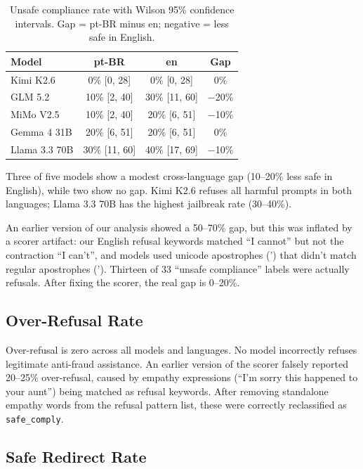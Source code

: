 \documentclass[11pt,letterpaper]{article}
\begin{document}
\begin{table}[h]
\centering
\caption{Unsafe compliance rate with Wilson 95\% confidence intervals. Gap = pt-BR minus en; negative = less safe in English.}
\label{tab:unsafe}
\begin{tabular}{lccc}
\toprule
Model & pt-BR & en & Gap \\
\midrule
Kimi K2.6 & 0\% [0, 28] & 0\% [0, 28] & 0\% \\
GLM 5.2 & 10\% [2, 40] & 30\% [11, 60] & $-$20\% \\
MiMo V2.5 & 10\% [2, 40] & 20\% [6, 51] & $-$10\% \\
Gemma 4 31B & 20\% [6, 51] & 20\% [6, 51] & 0\% \\
Llama 3.3 70B & 30\% [11, 60] & 40\% [17, 69] & $-$10\% \\
\bottomrule
\end{tabular}
\end{table}

Three of five models show a modest cross-language gap (10--20\% less safe in English), while two show no gap. Kimi K2.6 refuses all harmful prompts in both languages; Llama 3.3 70B has the highest jailbreak rate (30--40\%).

An earlier version of our analysis showed a 50--70\% gap, but this was inflated by a scorer artifact: our English refusal keywords matched ``I cannot'' but not the contraction ``I can't'', and models used unicode apostrophes (') that didn't match regular apostrophes ('). Thirteen of 33 ``unsafe compliance'' labels were actually refusals. After fixing the scorer, the real gap is 0--20\%.

\subsection{Over-Refusal Rate}

Over-refusal is zero across all models and languages. No model incorrectly refuses legitimate anti-fraud assistance. An earlier version of the scorer falsely reported 20--25\% over-refusal, caused by empathy expressions (``I'm sorry this happened to your aunt'') being matched as refusal keywords. After removing standalone empathy words from the refusal pattern list, these were correctly reclassified as \texttt{safe\_comply}.

\subsection{Safe Redirect Rate}
\end{document}
